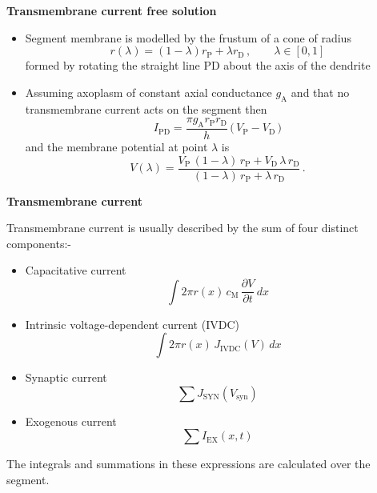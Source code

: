 \documentclass{slides}
\begin{document}
%
%
\begin{slide}
\centerline{\textbf{Transmembrane current free solution}}
\begin{itemize}
\item
Segment membrane is modelled by the frustum of a cone of radius
\[
r(\lambda)=(1-\lambda)r_\mathrm{P}+\lambda r_\mathrm{D} \,,\qquad
\lambda\in[0,1]
\]
formed by rotating the straight line PD about the axis of the
dendrite

\item
Assuming axoplasm of constant axial conductance $g_\mathrm{A}$ and
that no transmembrane current acts on the segment then
\[
I_\mathrm{PD}= \frac{\pi g_\mathrm{A} r_\mathrm{P}
r_\mathrm{D}}{h}\,\big(\,V_\mathrm{P}-V_\mathrm{D}\,\big)
\]
and the membrane potential at point $\lambda$ is
\[
V(\lambda) = \frac{V_\mathrm{P}\,(1-\lambda)\,
r_\mathrm{P}+V_\mathrm{D}\,\lambda\,r_\mathrm{D}}
{(1-\lambda)\,r_\mathrm{P}+\lambda\,r_\mathrm{D}}\,.
\]
\end{itemize}
\end{slide}

%
%
\begin{slide}
\centerline{\textbf{Transmembrane current}}

Transmembrane current is usually described by the sum of four
distinct components:-
\begin{itemize}
\item
Capacitative current
\[
\int 2\pi r(x) \,c_\mathrm{M}\,\frac{\partial V}{\partial t}\,dx
\]

\item
Intrinsic voltage-dependent current (IVDC)
\[
\int 2\pi r(x)\,J_\mathrm{IVDC}(V)\,dx
\]

\item
Synaptic current
\[
\sum J_\mathrm{SYN}(V_\mathrm{syn})
\]

\item
Exogenous current
\[
\sum I_\mathrm{EX}(x,t)
\]
\end{itemize}
The integrals and summations in these expressions are calculated
over the segment.
\end{slide}
\end{document}
